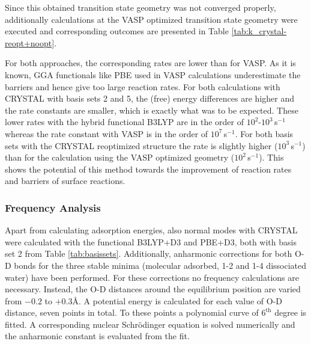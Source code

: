 \documentclass[11pt,DIV=13,BCOR=5mm,a4paper,headinclude]{scrbook}
\newcommand\todo[1]{\textcolor{red}{TODO: \textit{{#1}}}}
\begin{document}
Since this obtained transition state geometry was not converged properly, additionally calculations at the VASP optimized transition state geometry were executed and corresponding  outcomes are presented in Table \ref{tab:k_crystal-reopt+noopt}.


For both approaches, the corresponding rates are lower than for VASP. As it is known, GGA functionals like PBE used in VASP calculations underestimate the barriers\cite{Zhao05} and hence give too large reaction rates.
For both calculations with CRYSTAL with basis sets 2 and 5, the (free) energy differences are higher and the rate constants are smaller, which is exactly what was to be expected.
These lower rates with the hybrid functional B3LYP are in the order of $10^2$-$10^3\,$s$^{-1}$ whereas the rate constant with VASP is in the order of $10^7\,$s$^{-1}$. 
For both basis sets with the CRYSTAL reoptimized structure the rate is slightly higher ($10^3\,$s$^{-1}$) than for the calculation using the VASP optimized geometry ($10^2\,$s$^{-1}$).
This shows the potential of this method towards the improvement of reaction rates and barriers of surface reactions.


\subsubsection{Frequency Analysis}
Apart from calculating adsorption energies, also normal modes with CRYSTAL were calculated with the functional B3LYP+D3 and PBE+D3, both with basis set 2 from Table \ref{tab:basissets}.
Additionally, anharmonic corrections for both O-D bonds for the three stable minima (molecular adsorbed, 1-2 and 1-4 dissociated water) have been performed.
For these corrections no frequency calculations are necessary.
Instead, the O-D distances around the equilibrium position are varied from $-0.2$ to $+0.3$\AA{}.
A potential energy is calculated for each value of O-D distance, seven points in total.
To these points a polynomial curve of $6^\textrm{th}$ degree is fitted.
A corresponding nuclear Schrödinger equation is solved numerically and the anharmonic constant is evaluated from the fit.
\end{document}
